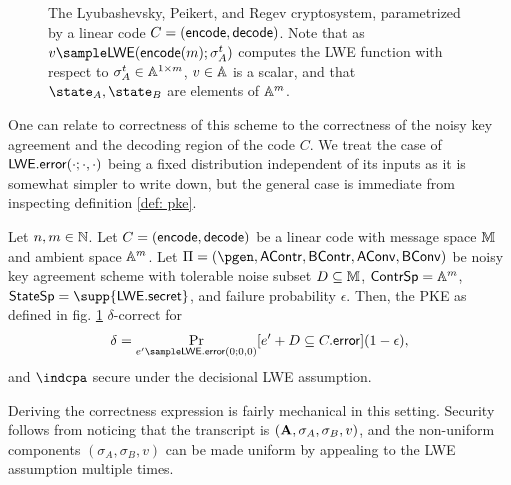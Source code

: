\begin{figure}[h]\label{fig: LPR PKE}
\begin{minipage}{.3\linewidth}
\end{minipage}\hfill
\begin{minipage}{.3\linewidth}
\end{minipage}\hfill
\begin{minipage}{.3\linewidth}
\end{minipage}

\caption{The Lyubashevsky, Peikert, and Regev cryptosystem, parametrized by a linear code $C = (\mathsf{encode}, \mathsf{decode})$.
Note that as $v\sample \LWE(\encode(m); \sigma_A^t)$ computes the LWE function with respect to $\sigma_A^t\in\mathbb{A}^{1\times m}$, $v\in\mathbb{A}$ is a scalar, and that $\state_A, \state_B$ are elements of $\mathbb{A}^m$.}
\end{figure}

One can relate to correctness of this scheme to the correctness of the noisy key agreement and the decoding region of the code $C$.
We treat the case of $\mathsf{LWE}.\mathsf{error}(\cdot;\cdot,\cdot)$ being a fixed distribution independent of its inputs as it is somewhat simpler to write down, but the general case is immediate from inspecting definition \ref{def: pke}.

\begin{theorem}\label{thm: lpr-correct-secure}
	Let $n,m\in\mathbb{N}$.
	Let $C = (\mathsf{encode}, \mathsf{decode})$ be a linear code with message space $\mathbb{M}$ and ambient space $\mathbb{A}^m$.
	Let $\Pi = (\pgen, \mathsf{AContr}, \mathsf{BContr}, \mathsf{AConv}, \mathsf{BConv})$ be noisy key agreement scheme with tolerable noise subset $D\subseteq \mathbb{M}$, $\mathsf{ContrSp} = \mathbb{A}^m$, $\mathsf{StateSp} = \supp{\LWE.\secret}$, and failure probability $\epsilon$.
	Then, the PKE as defined in fig. \ref{fig: LPR PKE} $\delta$-correct for
	\begin{equation*}
	\delta = \Pr_{e'\sample \LWE.\error(0; 0, 0)}[e' + D\subseteq C.\error](1-\epsilon),
	\end{equation*}
	and $\indcpa$ secure under the decisional LWE assumption.
\end{theorem}
Deriving the correctness expression is fairly mechanical in this setting.
Security follows from noticing that the transcript is $(\mathbf{A}, \sigma_A, \sigma_B, v)$, and the non-uniform components $(\sigma_A, \sigma_B, v)$ can be made uniform by appealing to the LWE assumption multiple times.


